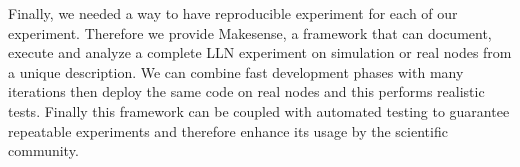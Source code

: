 {Finally, we needed a way to have reproducible experiment for each of our experiment. Therefore we provide Makesense, a framework that can document, execute and analyze a complete \ac{LLN} experiment on simulation or real nodes from a unique description.
We can combine fast development phases with many iterations then deploy the same code on real nodes and this performs realistic tests.
Finally this framework can be coupled with automated testing to guarantee repeatable experiments and therefore enhance its usage by the scientific community.
}

\resumeen

\endgroup

\vfill
